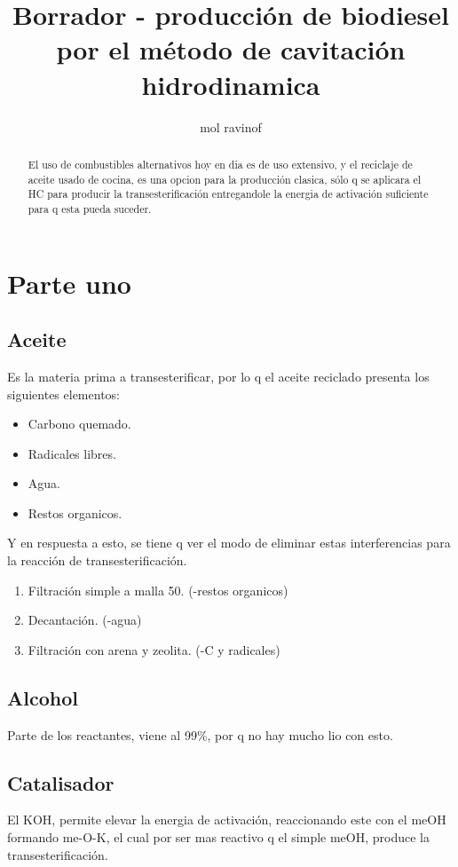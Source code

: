 \documentclass[a4paper,10pt]{article}
\title{Borrador - producción de biodiesel por el método de cavitación hidrodinamica}
\author{mol ravinof}
\begin{document}
\maketitle

\begin{abstract}
El uso de combustibles alternativos hoy en dia es de uso extensivo, y el reciclaje de aceite usado de cocina, es una opcion para la producción clasica, sólo q se aplicara el HC para producir la transesterificación entregandole la energia de activación suficiente para q esta pueda suceder.
\end{abstract}

\section{Parte uno}
\subsection{Aceite}
Es la materia prima a transesterificar, por lo q el aceite reciclado presenta los siguientes elementos:
\begin{itemize}
 \item Carbono quemado.
 \item Radicales libres.
 \item Agua.
 \item Restos organicos.
\end{itemize}

Y en respuesta a esto, se tiene q ver el modo de eliminar estas interferencias para la reacción de transesterificación.
\begin{enumerate}
 \item Filtración simple a malla 50. (-restos organicos)
 \item Decantación. (-agua)
 \item Filtración con arena y zeolita. (-C y radicales)
\end{enumerate}

\subsection{Alcohol}
Parte de los reactantes, viene al 99\%, por q no hay mucho lio con esto.

\subsection{Catalisador}
El KOH, permite elevar la energia de activación, reaccionando este con el meOH formando me-O-K, el cual por ser mas reactivo q el simple meOH, produce la transesterificación.
\end{document}
